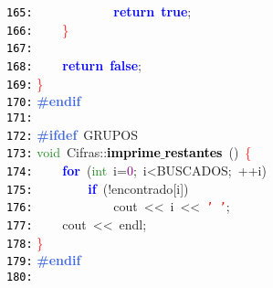 \documentclass[a4paper,10pt]{scrartcl}
\begin{document}
{   \mbox{}\texttt{\textcolor{Black}{165:}} \ \ \ \ \ \ \ \ \ \ \ \ \textbf{\textcolor{Blue}{return}}\ \textbf{\textcolor{Blue}{true}}\textcolor{BrickRed}{;} \\
   \mbox{}\texttt{\textcolor{Black}{166:}} \ \ \ \ \textcolor{Red}{\}} \\
   \mbox{}\texttt{\textcolor{Black}{167:}} \ \  \\
   \mbox{}\texttt{\textcolor{Black}{168:}} \ \ \ \ \textbf{\textcolor{Blue}{return}}\ \textbf{\textcolor{Blue}{false}}\textcolor{BrickRed}{;} \\
   \mbox{}\texttt{\textcolor{Black}{169:}} \textcolor{Red}{\}} \\
   \mbox{}\texttt{\textcolor{Black}{170:}} \textbf{\textcolor{RoyalBlue}{\#endif}} \\
   \mbox{}\texttt{\textcolor{Black}{171:}}  \\
   \mbox{}\texttt{\textcolor{Black}{172:}} \textbf{\textcolor{RoyalBlue}{\#ifdef}}\ GRUPOS \\
   \mbox{}\texttt{\textcolor{Black}{173:}} \textcolor{ForestGreen}{void}\ Cifras\textcolor{BrickRed}{::}\textbf{\textcolor{Black}{imprime$\_$restantes}}\ \textcolor{BrickRed}{()}\ \textcolor{Red}{\{} \\
   \mbox{}\texttt{\textcolor{Black}{174:}} \ \ \ \ \textbf{\textcolor{Blue}{for}}\ \textcolor{BrickRed}{(}\textcolor{ForestGreen}{int}\ i\textcolor{BrickRed}{=}\textcolor{Purple}{0}\textcolor{BrickRed}{;}\ i\textcolor{BrickRed}{\textless{}}BUSCADOS\textcolor{BrickRed}{;}\ \textcolor{BrickRed}{++}i\textcolor{BrickRed}{)} \\
   \mbox{}\texttt{\textcolor{Black}{175:}} \ \ \ \ \ \ \ \ \textbf{\textcolor{Blue}{if}}\ \textcolor{BrickRed}{(!}encontrado\textcolor{BrickRed}{[}i\textcolor{BrickRed}{])} \\
   \mbox{}\texttt{\textcolor{Black}{176:}} \ \ \ \ \ \ \ \ \ \ \ \ cout\ \textcolor{BrickRed}{\textless{}\textless{}}\ i\ \textcolor{BrickRed}{\textless{}\textless{}}\ \texttt{\textcolor{Red}{'\ '}}\textcolor{BrickRed}{;} \\
   \mbox{}\texttt{\textcolor{Black}{177:}} \ \ \ \ cout\ \textcolor{BrickRed}{\textless{}\textless{}}\ endl\textcolor{BrickRed}{;} \\
   \mbox{}\texttt{\textcolor{Black}{178:}} \textcolor{Red}{\}} \\
   \mbox{}\texttt{\textcolor{Black}{179:}} \textbf{\textcolor{RoyalBlue}{\#endif}} \\
   \mbox{}\texttt{\textcolor{Black}{180:}}  \\
}
\end{document}
